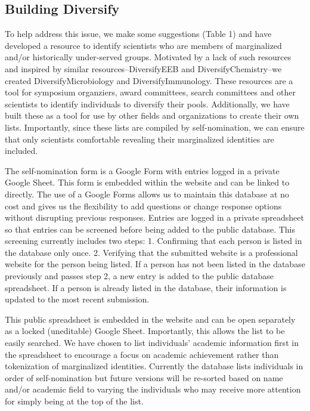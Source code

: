 \documentclass[10pt,]{article}
\begin{document}
\subsection{Building Diversify}\label{building-diversify}

To help address this issue, we make some suggestions (Table 1) and have
developed a resource to identify scientists who are members of
marginalized and/or historically under-served groups. Motivated by a
lack of such resources and inspired by similar resources--DiversifyEEB
and DiversifyChemistry--we created DiversifyMicrobiology and
DiversifyImmunology. These resources are a tool for symposium
organziers, award committees, search committees and other scientists to
identify individuals to diversify their pools. Additionally, we have
built these as a tool for use by other fields and organizations to
create their own lists. Importantly, since these lists are compiled by
self-nomination, we can ensure that only scientists comfortable
revealing their marginalized identities are included.

The self-nomination form is a Google Form with entries logged in a
private Google Sheet. This form is embedded within the website and can
be linked to directly. The use of a Google Forms allows us to maintain
this database at no cost and gives us the flexibility to add questions
or change response options without disrupting previous responses.
Entries are logged in a private spreadsheet so that entries can be
screened before being added to the public database. This screening
currently includes two steps: 1. Confirming that each person is listed
in the database only once. 2. Verifying that the submitted website is a
professional website for the person being listed. If a person has not
been listed in the database previously and passes step 2, a new entry is
added to the public database spreadsheet. If a person is already listed
in the database, their information is updated to the most recent
submission.

This public spreadsheet is embedded in the website and can be open
separately as a locked (uneditable) Google Sheet. Importantly, this
allows the list to be easily searched. We have chosen to list
individuals' academic information first in the spreadsheet to encourage
a focus on academic achievement rather than tokenization of marginalized
identities. Currently the database lists individuals in order of
self-nomination but future versions will be re-sorted based on name
and/or academic field to varying the individuals who may receive more
attention for simply being at the top of the list.
\end{document}
